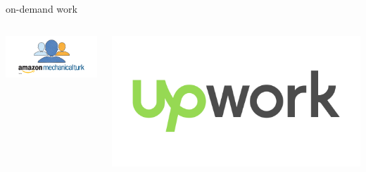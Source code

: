 \documentclass[presentation]{subfiles}
\begin{document}
\begin{frame}{on-demand work}
{\begin{columns}[onlytextwidth]
    \begin{column}{.25\textwidth}
      \includegraphics[width=\textwidth]{../../common_figures/amt.png}
    \end{column}
    \begin{column}{.25\textwidth}
      \includegraphics[width=\textwidth]{../../common_figures/upwork.png}
    \end{column}


    
  \end{columns}
  }

\end{frame}




\end{document}
